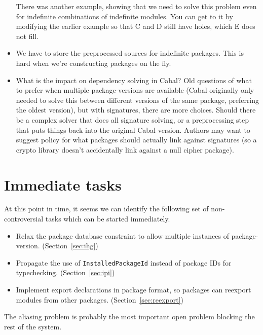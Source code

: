 \documentclass{article}
\begin{document}
\begin{itemize}
      There was another example, showing that we need to solve this
      problem even for indefinite combinations of indefinite modules.
      You can get to it by modifying the earlier example so that C and
      D still have holes, which E does not fill.

  \item We have to store the preprocessed sources for indefinite packages.
      This is hard when we're constructing packages on the fly.

  \item What is the impact on dependency solving in Cabal?  Old questions
      of what to prefer when multiple package-versions are available
      (Cabal originally only needed to solve this between different
      versions of the same package, preferring the oldest version), but
      with signatures, there are more choices.  Should there be a
      complex solver that does all signature solving, or a preprocessing
      step that puts things back into the original Cabal version.
      Authors may want to suggest policy for what packages should actually
      link against signatures (so a crypto library doesn't accidentally
      link against a null cipher package).
      \end{itemize}

\section{Immediate tasks}

At this point in time, it seems we can identify the following set
of non-controversial tasks which can be started immediately.

\begin{itemize}
    \item Relax the package database constraint to allow multiple
        instances of package-version. (Section~\ref{sec:ihg})
    \item Propagate the use of \verb|InstalledPackageId| instead of
        package IDs for typechecking. (Section~\ref{sec:ipi})
    \item Implement export declarations in package format, so
        packages can reexport modules from other packages. (Section~\ref{sec:reexport})
\end{itemize}

The aliasing problem is probably the most important open problem
blocking the rest of the system.



\end{document}
